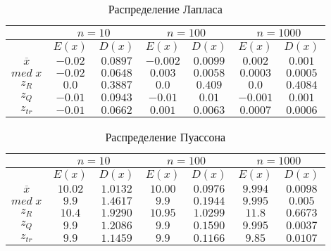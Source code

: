 \documentclass[12pt,a4paper]{article}
\begin{document}
\begin{center}
		\begin{table}[h!]
			\caption{Распределение Лапласа}
			\begin{center}
				\begin{tabular}{|c|c|c|c|c|c|c|}
					\hline
					& \multicolumn{2}{c|}{$n=10$} & \multicolumn{2}{c|}{$n=100$} & \multicolumn{2}{c|}{$n=1000$}\\
					\hline
					& $E(x)$ & $D(x)$ & $E(x)$ & $D(x)$ & $E(x)$ & $D(x)$\\
					\hline
					$\overline{x}$ & $-0.02$ & $0.0897$ & $-0.002$ & $0.0099$ & $0.002$ & $0.001$\\
					\hline
					$med\;x$ & $-0.02$ & $0.0648$ & $0.003$ & $0.0058$ & $0.0003$ & $0.0005$\\
					\hline
					$z_R$ & $0.0$ & $0.3887$ & $0.0$ & $0.409$ & $0.0$ & $0.4084$\\
					\hline
					$z_Q$ & $-0.01$ & $0.0943$ & $-0.01$ & $0.01$ & $-0.001$ & $0.001$\\
					\hline
					$z_{tr}$ & $-0.01$ & $0.0662$ & $0.001$ & $0.0063$ & $0.0007$ & $0.0006$\\
					\hline
				\end{tabular}
			\end{center}
		\end{table}
	
		\begin{table}[h]
			\caption{Распределение Пуассона}
			\begin{center}
				\begin{tabular}{|c|c|c|c|c|c|c|}
					\hline
					& \multicolumn{2}{c|}{$n=10$} & \multicolumn{2}{c|}{$n=100$} & \multicolumn{2}{c|}{$n=1000$}\\
					\hline
					& $E(x)$ & $D(x)$ & $E(x)$ & $D(x)$ & $E(x)$ & $D(x)$\\
					\hline
					$\overline{x}$ & $10.02$ & $1.0132$ & $10.00$ & $0.0976$ & $9.994$ & $0.0098$\\
					\hline
					$med\;x$ & $9.9$ & $1.4617$ & $9.9$ & $0.1944$ & $9.995$ & $0.005$\\
					\hline
					$z_R$ & $10.4$ & $1.9290$ & $10.95$ & $1.0299$ & $11.8$ & $0.6673$\\
					\hline
					$z_Q$ & $9.9$ & $1.2086$ & $9.9$ & $0.1590$ & $9.995$ & $0.0037$\\
					\hline
					$z_{tr}$ & $9.9$ & $1.1459$ & $9.9$ & $0.1166$ & $9.85$ & $0.0107$\\
					\hline
				\end{tabular}
			\end{center}
		\end{table}
	

\end{center}
\end{document}
